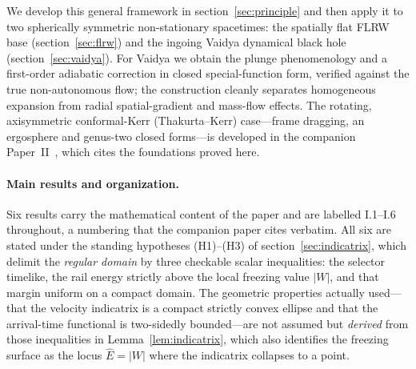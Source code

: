 \documentclass[12pt]{iopart}
\newcommand{\Ehat}{\hat E}
\theoremstyle{plain}
\theoremstyle{definition}
\theoremstyle{plain}
\theoremstyle{remark}
\begin{document}
We develop this general framework in section~\ref{sec:principle} and then apply it to two
spherically symmetric non-stationary spacetimes: the spatially flat FLRW base
(section~\ref{sec:flrw}) and the ingoing Vaidya dynamical black hole
(section~\ref{sec:vaidya}). For Vaidya we obtain the plunge phenomenology and a
first-order adiabatic correction in closed special-function form, verified against the
true non-autonomous flow; the construction cleanly separates homogeneous expansion from
radial spatial-gradient and mass-flow effects. The rotating, axisymmetric conformal-Kerr
(Thakurta--Kerr) case---frame dragging, an ergosphere and genus-two closed forms---is
developed in the companion Paper~II~\cite{PaperTwo}, which cites the foundations proved
here.

\paragraph{Main results and organization.} Six results carry the mathematical content of
the paper and are labelled I.1--I.6 throughout, a numbering that the companion paper cites
verbatim. All six are stated under the standing hypotheses (H1)--(H3) of
section~\ref{sec:indicatrix}, which delimit the \emph{regular domain} by three checkable
scalar inequalities: the selector timelike, the rail energy strictly above the local
freezing value $|W|$, and that margin uniform on a compact domain. The geometric
properties actually used---that the velocity indicatrix is a compact strictly convex
ellipse and that the arrival-time functional is two-sidedly bounded---are not assumed but
\emph{derived} from those inequalities in Lemma~\ref{lem:indicatrix}, which also identifies
the freezing surface as the locus $\Ehat=|W|$ where the indicatrix collapses to a point.
\end{document}
